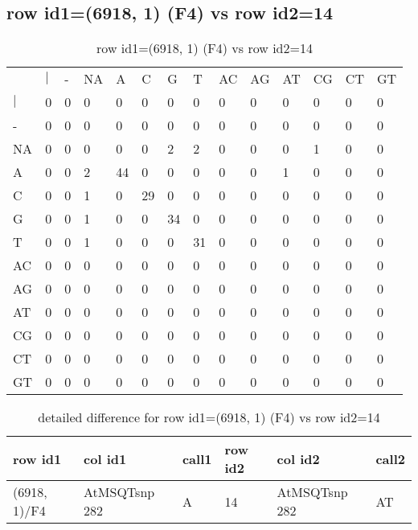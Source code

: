 \subsection{row id1=(6918, 1) (F4) vs row id2=14}
\begin{center}
\begin{longtable}{|l|l|l|l|l|l|l|l|l|l|l|l|l|l|}
\caption{row id1=(6918, 1) (F4) vs row id2=14} \label{table_dm102}\\
\hline
\\
\hline
&$|$&-&NA&A&C&G&T&AC&AG&AT&CG&CT&GT\\
$|$&0&0&0&0&0&0&0&0&0&0&0&0&0\\
-&0&0&0&0&0&0&0&0&0&0&0&0&0\\
NA&0&0&0&0&0&2&2&0&0&0&1&0&0\\
A&0&0&2&44&0&0&0&0&0&1&0&0&0\\
C&0&0&1&0&29&0&0&0&0&0&0&0&0\\
G&0&0&1&0&0&34&0&0&0&0&0&0&0\\
T&0&0&1&0&0&0&31&0&0&0&0&0&0\\
AC&0&0&0&0&0&0&0&0&0&0&0&0&0\\
AG&0&0&0&0&0&0&0&0&0&0&0&0&0\\
AT&0&0&0&0&0&0&0&0&0&0&0&0&0\\
CG&0&0&0&0&0&0&0&0&0&0&0&0&0\\
CT&0&0&0&0&0&0&0&0&0&0&0&0&0\\
GT&0&0&0&0&0&0&0&0&0&0&0&0&0\\
\hline
\end{longtable}
\end{center}

\begin{center}
\begin{longtable}{|l|l|l|l|l|l|}
\caption{detailed difference for row id1=(6918, 1) (F4) vs row id2=14} \label{table_dm103}\\
\hline
row id1&col id1&call1&row id2&col id2&call2\\
\hline
(6918, 1)/F4&AtMSQTsnp 282&A&14&AtMSQTsnp 282&AT\\
\hline
\end{longtable}
\end{center}

